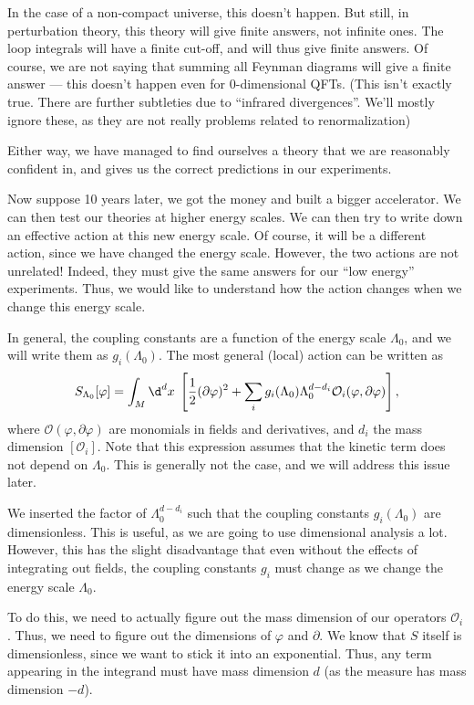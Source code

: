 \documentclass[a4paper]{article}
\begin{document}
In the case of a non-compact universe, this doesn't happen. But still, in perturbation theory, this theory will give finite answers, not infinite ones. The loop integrals will have a finite cut-off, and will thus give finite answers. Of course, we are not saying that summing all Feynman diagrams will give a finite answer --- this doesn't happen even for 0-dimensional QFTs. (This isn't exactly true. There are further subtleties due to ``infrared divergences''. We'll mostly ignore these, as they are not really problems related to renormalization)

Either way, we have managed to find ourselves a theory that we are reasonably confident in, and gives us the correct predictions in our experiments.

Now suppose 10 years later, we got the money and built a bigger accelerator. We can then test our theories at higher energy scales. We can then try to write down an effective action at this new energy scale. Of course, it will be a different action, since we have changed the energy scale. However, the two actions are not unrelated! Indeed, they must give the same answers for our ``low energy'' experiments. Thus, we would like to understand how the action changes when we change this energy scale.

In general, the coupling constants are a function of the energy scale $\Lambda_0$, and we will write them as $g_i(\Lambda_0)$. The most general (local) action can be written as
\[
  S_{\Lambda_0} [\varphi] = \int_M \d^d x\; \left[\frac{1}{2}(\partial \varphi)^2 + \sum_i g_i(\Lambda_0) \Lambda^{d - d_i}_0 \mathcal{O}_i(\varphi , \partial\varphi)\right],
\]
where $\mathcal{O}(\varphi, \partial \varphi)$ are monomials in fields and derivatives, and $d_i$ the mass dimension $[\mathcal{O}_i]$. Note that this expression assumes that the kinetic term does not depend on $\Lambda_0$. This is generally not the case, and we will address this issue later.

We inserted the factor of $\Lambda_0^{d - d_i}$ such that the coupling constants $g_i(\Lambda_0)$ are dimensionless. This is useful, as we are going to use dimensional analysis a lot. However, this has the slight disadvantage that even without the effects of integrating out fields, the coupling constants $g_i$ must change as we change the energy scale $\Lambda_0$.

To do this, we need to actually figure out the mass dimension of our operators $\mathcal{O}_i$. Thus, we need to figure out the dimensions of $\varphi$ and $\partial$. We know that $S$ itself is dimensionless, since we want to stick it into an exponential. Thus, any term appearing in the integrand must have mass dimension $d$ (as the measure has mass dimension $-d$).
\end{document}
